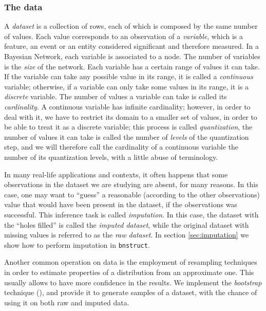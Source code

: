 \documentclass{article}\usepackage[]{graphicx}\usepackage[]{color}
\newcommand{\Rpackage}[1]{{\texttt{#1}}}
\begin{document}
\subsubsection{The data}
A \emph{dataset} is a collection of rows, each of which is composed by the same number
of values. Each value corresponds to an observation of a \emph{variable}, which is a feature,
an event or an entity considered significant and therefore measured. In a Bayesian Network,
each variable is associated to a node. The number of variables is the \emph{size} of the
network. Each variable has a certain range of values it can take. If the variable can take
any possible value in its range, it is called a \emph{continuous} variable; otherwise,
if a variable can only take some values in its range, it is a \emph{discrete} variable.
The number of values a variable can take is called its \emph{cardinality}.
A continuous variable has infinite cardinality; however, in order to deal with it,
we have to restrict its domain to a smaller set of values, in order to be able to
treat it as a discrete variable; this process is called \emph{quantization}, the
number of values it can take is called the number of \emph{levels} of the quantization step,
and we will therefore call the cardinality of a continuous variable the number of its
quantization levels, with a little abuse of terminology.

In many real-life applications and contexts, it often happens that some observations in
the dataset we are studying are absent, for many reasons. In this case, one may want to
``guess'' a reasonable (according to the other observations) value that would have been
present in the dataset, if the observations was successful. This inference task is
called \emph{imputation}. In this case, the dataset with the ``holes filled''
is called the \emph{imputed dataset}, while the original dataset with missing values is
referred to as the \emph{raw dataset}.
In section \ref{sec:imputation} we show how to perform imputation in \Rpackage{bnstruct}.

Another common operation on data is the employment of resampling techniques in order
to estimate properties of a distribution from an approximate one. This usually allows
to have more confidence in the results. We implement the \emph{bootstrap} technique (\citet{efron1994introduction}),
and provide it to generate samples of a dataset, with the chance of using it on both raw and imputed data.
\end{document}
